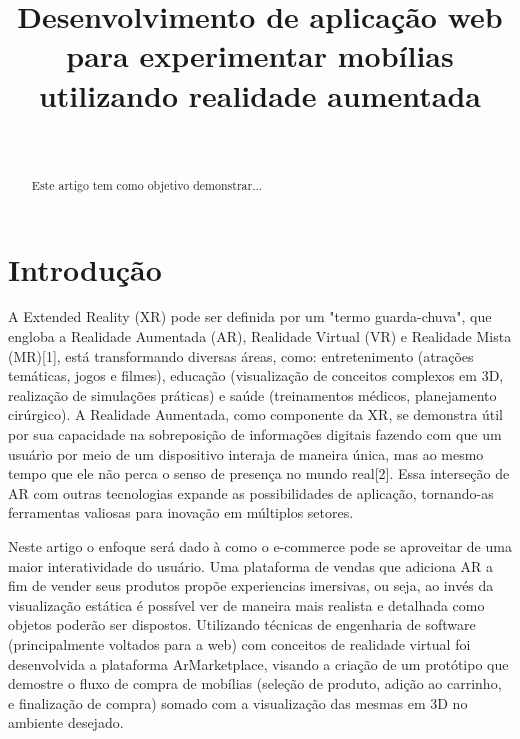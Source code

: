 \documentclass[conference]{IEEEtran}
\begin{document}
\title{Desenvolvimento de aplicação web para experimentar mobílias utilizando realidade aumentada\\
}

\author{
   \\

}

\maketitle

\begin{abstract}
  Este artigo tem como objetivo demonstrar...
\end{abstract}

\section{Introdução}
A Extended Reality (XR) pode ser definida por um "termo guarda-chuva", que
engloba a Realidade Aumentada (AR), Realidade Virtual (VR) e Realidade Mista
(MR)[1], está transformando diversas áreas, como: entretenimento (atrações
temáticas, jogos e filmes), educação (visualização de conceitos complexos em
3D, realização de simulações práticas) e saúde (treinamentos médicos,
planejamento cirúrgico). A Realidade Aumentada, como componente da XR, se
demonstra útil por sua capacidade na sobreposição de informações digitais
fazendo com que um usuário por meio de um dispositivo interaja de maneira
única, mas ao mesmo tempo que ele não perca o senso de presença no mundo
real[2]. Essa interseção de AR com outras tecnologias expande as possibilidades
de aplicação, tornando-as ferramentas valiosas para inovação em múltiplos
setores.

\par
Neste artigo o enfoque será dado à como o e-commerce pode se aproveitar de uma
maior interatividade do usuário. Uma plataforma de vendas que adiciona AR a fim
de vender seus produtos propõe experiencias imersivas, ou seja, ao invés da
visualização estática é possível ver de maneira mais realista e detalhada como
objetos poderão ser dispostos. Utilizando técnicas de engenharia de software
(principalmente voltados para a web) com conceitos de realidade virtual foi
desenvolvida a plataforma ArMarketplace, visando a criação de um protótipo que
demostre o fluxo de compra de mobílias (seleção de produto, adição ao carrinho,
e finalização de compra) somado com a visualização das mesmas em 3D no ambiente
desejado.
\end{document}
